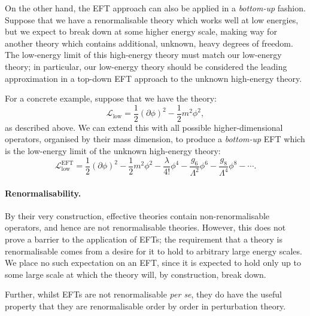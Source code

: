 \documentclass[withindex,glossary]{cam-thesis}
\begin{document}
On the other hand, the EFT approach can also be applied in a \textit{bottom-up} fashion. Suppose that we have a renormalisable theory which works well at low energies, but we expect to break down at some higher energy scale, making way for another theory which contains additional, unknown, heavy degrees of freedom. The low-energy limit of this high-energy theory must match our low-energy theory; in particular, our low-energy theory should be considered the leading approximation in a top-down EFT approach to the unknown high-energy theory. 

For a concrete example, suppose that we have the theory:
\begin{equation}
\mathcal{L}_{\text{low}} = \frac{1}{2}(\partial \phi)^2 - \frac{1}{2}m^2 \phi^2,
\end{equation}
as described above. We can extend this with all possible higher-dimensional operators, organised by their mass dimension, to produce a \textit{bottom-up} EFT which is the low-energy limit of the unknown high-energy theory:
\begin{equation}
\mathcal{L}_{\text{low}}^{\text{EFT}} = \frac{1}{2} (\partial \phi)^2 - \frac{1}{2}m^2 \phi^2 - \frac{\lambda}{4!} \phi^4 - \frac{g_6}{\Lambda^2} \phi^6 - \frac{g_8}{\Lambda^4} \phi^8 - \cdots.
\end{equation}


\paragraph{Renormalisability.} By their very construction, effective theories contain non-renormalisable operators, and hence are not renormalisable theories. However, this does not prove a barrier to the application of EFTs; the requirement that a theory is renormalisable comes from a desire for it to hold to arbitrary large energy scales. We place no such expectation on an EFT, since it is expected to hold only up to some large scale at which the theory will, by construction, break down.

Further, whilst EFTs are not renormalisable \textit{per se}, they do have the useful property that they are renormalisable order by order in perturbation theory.
\end{document}
